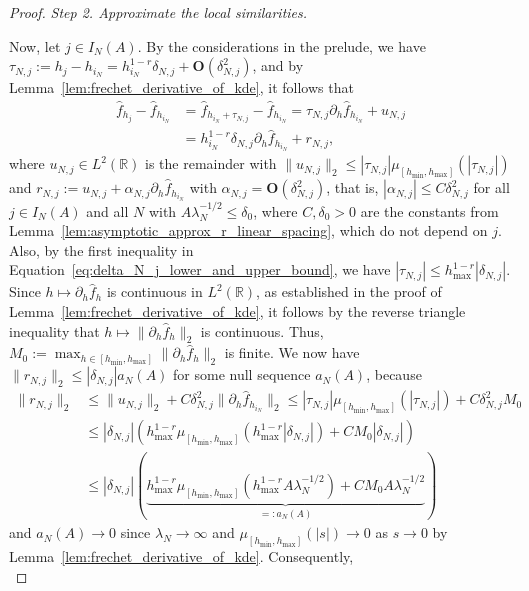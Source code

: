 \begin{proof}
    \textit{Step 2. Approximate the local similarities.}

    Now, let $j\in I_N(A)$. By the considerations in the prelude, we have $\tau_{N,j}:=h_j-h_{i_N}=h_{i_N}^{1-r}\delta_{N,j}+\mathbf{O}(\delta_{N,j}^2)$, and by Lemma~\ref{lem:frechet_derivative_of_kde}, it follows that
    \begin{align*}
        \hat{f}_{h_j}-\hat{f}_{h_{i_N}}&=\hat{f}_{h_{i_N}+\tau_{N,j}}-\hat{f}_{h_{i_N}}=\tau_{N,j}\partial_{h}\hat{f}_{h_{i_N}}+u_{N,j}\\&
        =h_{i_N}^{1-r}\delta_{N,j}\partial_h\hat{f}_{h_{i_N}}+r_{N,j},
    \end{align*}
    where $u_{N,j}\in L^2(\mathbb{R})$ is the remainder with $\|u_{N,j}\|_2\le|\tau_{N,j}|\mu_{[h_{\min},h_{\max}]}(|\tau_{N,j}|)$ and $r_{N,j}:=u_{N,j}+\alpha_{N,j}\partial_h\hat{f}_{h_{i_N}}$ with $\alpha_{N,j}=\mathbf{O}(\delta_{N,j}^2)$, that is, $|\alpha_{N,j}|\le C\delta_{N,j}^2$ for all $j\in I_N(A)$ and all $N$ with $A\lambda_N^{-1/2}\le\delta_0$, where $C,\delta_0>0$ are the constants from Lemma~\ref{lem:asymptotic_approx_r_linear_spacing}, which do not depend on $j$. Also, by the first inequality in Equation~\eqref{eq:delta_N_j_lower_and_upper_bound}, we have $|\tau_{N,j}|\le h_{\max}^{1-r}|\delta_{N,j}|$. Since $h\mapsto\partial_h\hat{f}_h$ is continuous in $L^2(\mathbb{R})$, as established in the proof of Lemma~\ref{lem:frechet_derivative_of_kde}, it follows by the reverse triangle inequality that $h\mapsto\|\partial_h\hat{f}_h\|_2$ is continuous. Thus, $M_0:=\max_{h\in[h_{\min},h_{\max}]}\|\partial_h\hat{f}_h\|_2$ is finite. We now have $\|r_{N,j}\|_2\le|\delta_{N,j}|a_N(A)$ for some null sequence $a_N(A)$, because
    \begin{align*}
        \|r_{N,j}\|_2&\le\|u_{N,j}\|_2+C\delta_{N,j}^2\|\partial_h\hat{f}_{h_{i_N}}\|_2
        \le|\tau_{N,j}|\mu_{[h_{\min},h_{\max}]}(|\tau_{N,j}|)+C\delta_{N,j}^2M_0\\&
        \le|\delta_{N,j}|\left(h_{\max}^{1-r}\mu_{[h_{\min},h_{\max}]}(h_{\max}^{1-r}|\delta_{N,j}|)+CM_0|\delta_{N,j}|\right)\\&
        \le
        |\delta_{N,j}|\left(\underbrace{h_{\max}^{1-r}\mu_{[h_{\min},h_{\max}]}(h_{\max}^{1-r}A\lambda_N^{-1/2})+CM_0A\lambda_N^{-1/2}}_{=:a_N(A)}\right)
    \end{align*}
    and $a_N(A)\to0$ since $\lambda_N\to\infty$ and $\mu_{[h_{\min},h_{\max}]}(|s|)\to0$ as $s\to0$ by Lemma~\ref{lem:frechet_derivative_of_kde}. Consequently,
    \begin{equation}

\end{equation}
\end{proof}
